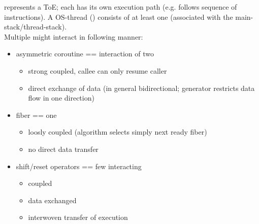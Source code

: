 \label{appendixb}
\ectx represents a ToE; each \ectx has its own execution path (e.g. follows
sequence of instructions). A OS-thread () consists of at least
one \ectx (associated with the main-stack/thread-stack).\\
Multiple \ectx might interact in following manner:
\begin{itemize}
\item asymmetric coroutine == interaction of two \ectx
    \begin{itemize}
        \item strong coupled, callee \ectx can only resume caller
        \item direct exchange of data (in general bidirectional; generator
              restricts data flow in one direction)
    \end{itemize}
\item fiber == one \ectx
    \begin{itemize}
        \item loosly coupled (algorithm selects simply next ready fiber)
        \item no direct data transfer
    \end{itemize}
\item shift/reset operators == few interacting \ectx
    \begin{itemize}
        \item coupled
        \item data exchanged
        \item interwoven transfer of execution
    \end{itemize}
\end{itemize}
